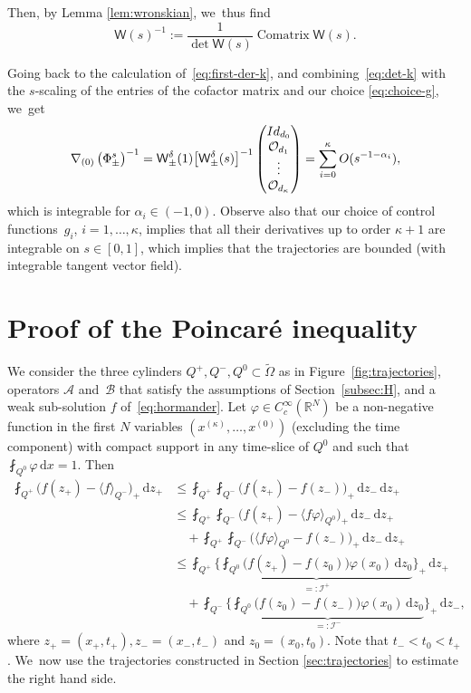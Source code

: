 \documentclass[10pt]{amsart}
\theoremstyle{definition}
\newcommand\R{{\mathbb R}}
\newcommand{\cI}{{\mathcal I}}
\newcommand{\sW}{{\mathsf W}}
\newcommand{\dd}{{\, \mathrm d}}
\begin{document}
Then, by Lemma \ref{lem:wronskian}, we~thus find
\begin{equation*}
\sW (s)^{-1} :=
\frac{1}{\det \sW(s)} \operatorname{Comatrix} \sW(s).
\end{equation*}

Going back to the calculation of~\eqref{eq:first-der-k}, and combining~\eqref{eq:det-k}
with the $s$-scaling of the entries of the cofactor matrix and our choice \eqref{eq:choice-g}, we~get
\begin{equation}
\label{eq:grad-phi}
\nabla_{(0)} \left(\Phi^s_\pm \right)^{-1}
= \sW_\pm ^\delta (1) \big[\sW_\pm ^\delta(s)\big]^{-1}
\begin{pmatrix}
\Id_{d_0} \\ \OO_{d_1} \\ \vdots \\ \OO_{d_\kappa}
\end{pmatrix}
= \sum_{i=0} ^\kappa O(s^{-1-\alpha_i}),
\end{equation}
which is integrable for $\alpha_i \in (-1,0)$. Observe also that
our choice of control functions~$g_i$, $i=1,\dots,\kappa$,
implies that all their derivatives up to order $\kappa+1$ are
integrable on $s \in [0,1]$, which implies that the trajectories
are bounded (with integrable tangent vector field).

\section{Proof of the Poincaré inequality}
\label{sec:proof}

We consider the three cylinders $Q^+,Q^-, Q^0 \subset \tilde \Omega$ as
in Figure~\ref{fig:trajectories}, operators $\mathcal A$ and~$\mathcal B$ that satisfy the assumptions of Section~\ref{subsec:H}, and a weak sub-solution $f$
of~\eqref{eq:hormander}. Let $\varphi \in C_c^\infty(\R^{N})$ be a
non-negative function in the first $N$ variables
$(x^{(\kappa)},\dots,x^{(0)})$ (excluding the time component)
with compact support in any time-slice of $Q^0$ and such that
$\fint_{Q^0} \varphi \dd x = 1$. Then
\begin{equation}
\label{eq:poincare-aux}
\begin{aligned}
\fint_{Q^+} \Big(f(z_+) - \langle f\rangle_{Q^-}\Big)_+ \dd
z_+ & \leq \fint_{Q^+} \fint_{Q^-} \Big(f(z_+) - f(z_{-})
\Big)_+
\dd z_{-} \dd z_+ \\
& \leq \fint_{Q^+} \fint_{Q^-} \Big(f(z_+) - \langle
f\varphi\rangle_{Q^0}\Big)_+\dd z_{-} \dd z_+ \\
&\quad + \fint_{Q^+} \fint_{Q^-} \Big(\langle
f\varphi\rangle_{Q^0} - f(z_{-})\Big)_+ \dd z_{-}\dd z_+ \\
& \leq \fint_{Q^+} \Bigg\{\underbrace{\fint_{Q^0} \big(f(z_+)
- f(z_0)\big)\varphi(x_0) \dd z_0}_{=: \cI^+}
\Bigg\}_+ \dd z_+ \\
& \quad + \fint_{Q^-} \Bigg\{\underbrace{\fint_{Q^0}
\big(f(z_0) - f(z_{-})\big)\varphi(x_0) \dd z_0}_{=:
\cI^-}\Bigg\}_+ \dd z_{-},
\end{aligned}
\end{equation}
where $z_+ = (x_+, t_+), z_- = (x_-, t_-)$ and
$z_0 = (x_0, t_0)$. Note that $t_{-} < t_0 < t_+$. We~now use
the trajectories constructed in Section \ref{sec:trajectories} to
estimate the right hand side.
\end{document}
